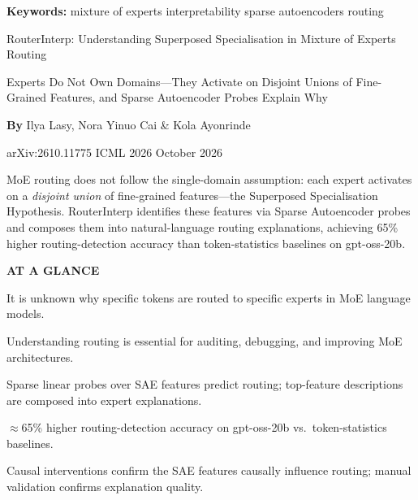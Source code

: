\documentclass[10pt,twocolumn]{article}
\begin{document}
\setlength{\parindent}{0pt}
\setlength{\parskip}{4pt}

{\small\color{keywordgray}\textbf{Keywords:}
  mixture of experts \textbullet{}
  interpretability \textbullet{}
  sparse autoencoders \textbullet{}
  routing}\par\vspace{4pt}

{\LARGE\bfseries\raggedright
  RouterInterp: Understanding Superposed Specialisation in
  Mixture of Experts Routing}\par\vspace{4pt}

{\large\itshape\raggedright
  Experts Do Not Own Domains---They Activate on Disjoint Unions of
  Fine-Grained Features, and Sparse Autoencoder Probes Explain Why}\par\vspace{6pt}

{\small\textbf{By} Ilya Lasy, Nora Yinuo Cai \& Kola Ayonrinde}\par\vspace{2pt}

{\small\color{keywordgray}arXiv:2610.11775 \textbullet{} ICML 2026 \textbullet{} October 2026}
\par\vspace{2pt}\noindent{\color{rulered}\rule{\columnwidth}{0.6pt}}\vspace{6pt}

MoE routing does not follow the single-domain assumption:
each expert activates on a \emph{disjoint union} of fine-grained
features---the Superposed Specialisation Hypothesis. RouterInterp identifies
these features via Sparse Autoencoder probes and composes them into
natural-language routing explanations, achieving 65\% higher routing-detection
accuracy than token-statistics baselines on gpt-oss-20b.

\begin{mdframed}[backgroundcolor=boxgray,linecolor=rulered,linewidth=1pt,
    innerleftmargin=6pt,innerrightmargin=6pt,
    innertopmargin=6pt,innerbottommargin=6pt]
\textbf{\small AT A GLANCE}\par\vspace{4pt}
\begin{description}[leftmargin=0pt,labelsep=4pt,itemsep=2pt,parsep=0pt,
    font=\small\bfseries]
  \item[Problem:] It is unknown why specific tokens are routed to specific
    experts in MoE language models.
  \item[Why it matters:] Understanding routing is essential for auditing,
    debugging, and improving MoE architectures.
  \item[Method:] Sparse linear probes over SAE features predict routing;
    top-feature descriptions are composed into expert explanations.
  \item[Result:] $\approx$65\% higher routing-detection accuracy on
    gpt-oss-20b vs.\ token-statistics baselines.
  \item[Evidence:] Causal interventions confirm the SAE features causally
    influence routing; manual validation confirms explanation quality.
\end{description}
\end{mdframed}
\end{document}
